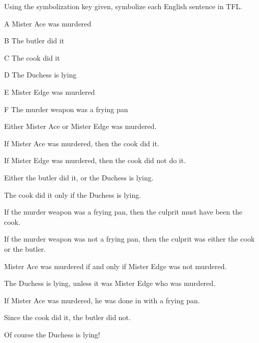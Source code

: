\problempart Using the symbolization key given, symbolize each English sentence in TFL.
\begin{ekey}
\item[A] Mister Ace was murdered
\item[B] The butler did it
\item[C] The cook did it
\item[D] The Duchess is lying
\item[E] Mister Edge was murdered
\item[F] The murder weapon was a frying pan
\end{ekey}
\begin{compactlist}
\item Either Mister Ace or Mister Edge was murdered.
\item If Mister Ace was murdered, then the cook did it.
\item If Mister Edge was murdered, then the cook did not do it.
\item Either the butler did it, or the Duchess is lying.
\item The cook did it only if the Duchess is lying.
\item If the murder weapon was a frying pan, then the culprit must have been the cook.
\item If the murder weapon was not a frying pan, then the culprit was either the cook or the butler.
\item Mister Ace was murdered if and only if Mister Edge was not murdered.
\item The Duchess is lying, unless it was Mister Edge who was murdered.
\item If Mister Ace was murdered, he was done in with a frying pan.
\item Since the cook did it, the butler did not.
\item Of course the Duchess is lying!
\end{compactlist}
\solutions

